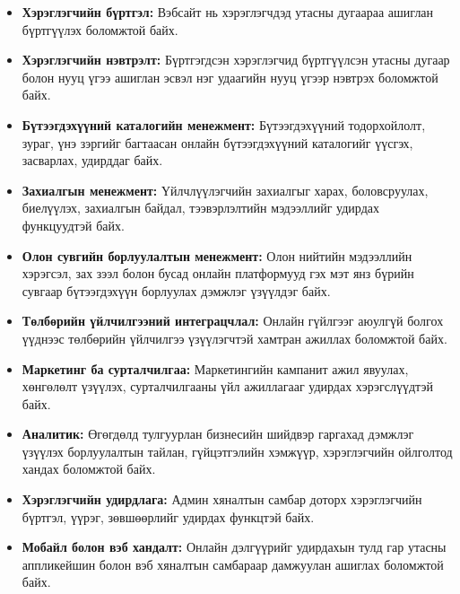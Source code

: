\begin{itemize}
   \item \textbf{Хэрэглэгчийн бүртгэл:} Вэбсайт нь хэрэглэгчдэд утасны дугаараа ашиглан бүртгүүлэх боломжтой байх.

   \item \textbf{Хэрэглэгчийн нэвтрэлт:} Бүртгэгдсэн хэрэглэгчид бүртгүүлсэн утасны дугаар болон нууц үгээ ашиглан эсвэл нэг удаагийн нууц үгээр нэвтрэх боломжтой байх.

	\item \textbf{Бүтээгдэхүүний каталогийн менежмент:} Бүтээгдэхүүний тодорхойлолт, зураг, үнэ зэргийг багтаасан онлайн бүтээгдэхүүний каталогийг үүсгэх, засварлах, удирддаг байх.

   \item \textbf{Захиалгын менежмент:} Үйлчлүүлэгчийн захиалгыг харах, боловсруулах, биелүүлэх, захиалгын байдал, тээвэрлэлтийн мэдээллийг удирдах функцуудтэй байх.

   \item \textbf{Олон сувгийн борлуулалтын менежмент:} Олон нийтийн мэдээллийн хэрэгсэл, зах зээл болон бусад онлайн платформууд гэх мэт янз бүрийн сувгаар бүтээгдэхүүн борлуулах дэмжлэг үзүүлдэг байх.

   \item \textbf{Төлбөрийн үйлчилгээний интеграцчлал:} Онлайн гүйлгээг аюулгүй болгох үүднээс төлбөрийн үйлчилгээ үзүүлэгчтэй хамтран ажиллах боломжтой байх.

   \item \textbf{Маркетинг ба сурталчилгаа:} Маркетингийн кампанит ажил явуулах, хөнгөлөлт үзүүлэх, сурталчилгааны үйл ажиллагааг удирдах хэрэгслүүдтэй байх.

   \item \textbf{Аналитик:} Өгөгдөлд тулгуурлан бизнесийн шийдвэр гаргахад дэмжлэг үзүүлэх борлуулалтын тайлан, гүйцэтгэлийн хэмжүүр, хэрэглэгчийн ойлголтод хандах боломжтой байх.

   \item \textbf{Хэрэглэгчийн удирдлага:} Админ хяналтын самбар доторх хэрэглэгчийн бүртгэл, үүрэг, зөвшөөрлийг удирдах функцтэй байх.

   \item \textbf{Мобайл болон вэб хандалт:} Онлайн дэлгүүрийг удирдахын тулд гар утасны аппликейшин болон вэб хяналтын самбараар дамжуулан ашиглах боломжтой байх.
\end{itemize}

